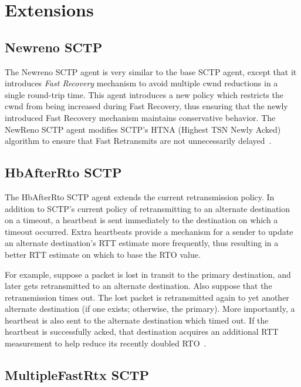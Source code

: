    \section{Extensions}
   \label{sec:sctpExtensions}

      \subsection{Newreno SCTP} 

	 The Newreno SCTP agent is very similar to the base SCTP agent,
	 except that it introduces {\em Fast Recovery} mechanism to avoid
	 multiple cwnd reductions in a single round-trip time. This agent
	 introduces a new policy which restricts the cwnd from being
	 increased during Fast Recovery, thus ensuring that the newly
	 introduced Fast Recovery mechanism maintains conservative
	 behavior. The NewReno SCTP agent modifies SCTP's HTNA (Highest
	 TSN Newly Acked) algorithm to ensure that Fast Retransmits are
	 not unnecessarily delayed~\cite{SCTP_CARO_2003b}.

      \subsection{HbAfterRto SCTP}

	 The HbAfterRto SCTP agent extends the current retransmission
	 policy. In addition to SCTP's current policy of retransmitting to
	 an alternate destination on a timeout, a heartbeat is sent
	 immediately to the destination on which a timeout occurred. Extra
	 heartbeats provide a mechanism for a sender to update an
	 alternate destination's RTT estimate more frequently, thus
	 resulting in a better RTT estimate on which to base the RTO
	 value.

	 For example, suppose a packet is lost in transit to the primary
	 destination, and later gets retransmitted to an alternate
	 destination. Also suppose that the retransmission times out. The
	 lost packet is retransmitted again to yet another alternate
	 destination (if one exists; otherwise, the primary). More
	 importantly, a heartbeat is also sent to the alternate
	 destination which timed out. If the heartbeat is successfully
	 acked, that destination acquires an additional RTT measurement to
	 help reduce its recently doubled RTO~\cite{SCTP_CARO_2003e}.

      \subsection{MultipleFastRtx SCTP}

